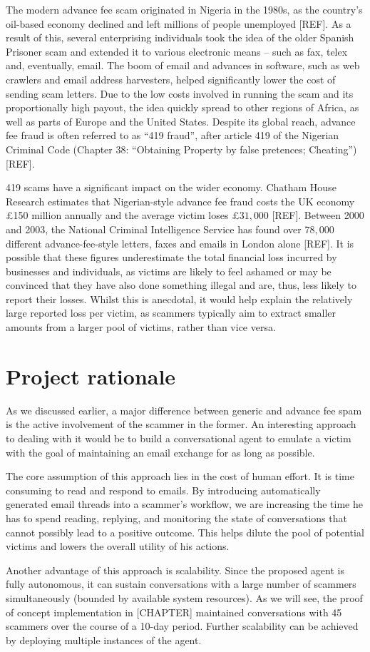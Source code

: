 The modern advance fee scam originated in Nigeria in the 1980s, as the country's oil-based economy declined and left millions of people unemployed [REF]. As a result of this, several enterprising individuals took the idea of the older Spanish Prisoner scam and extended it to various electronic means -- such as fax, telex and, eventually, email. The boom of email and advances in software, such as web crawlers and email address harvesters, helped significantly lower the cost of sending scam letters. Due to the low costs involved in running the scam and its proportionally high payout, the idea quickly spread to other regions of Africa, as well as parts of Europe and the United States. Despite its global reach, advance fee fraud is often referred to as ``419 fraud'', after article 419 of the Nigerian Criminal Code (Chapter 38: “Obtaining Property by false pretences; Cheating”) [REF].

419 scams have a significant impact on the wider economy. Chatham House Research estimates that Nigerian-style advance fee fraud costs the UK economy \pounds150 million annually and the average victim loses \pounds$31,000$ [REF]. Between 2000 and 2003, the National Criminal Intelligence Service has found over $78,000$ different advance-fee-style letters, faxes and emails in London alone [REF]. It is possible that these figures underestimate the total financial loss incurred by businesses and individuals, as victims are likely to feel ashamed or may be convinced that they have also done something illegal and are, thus, less likely to report their losses. Whilst this is anecdotal, it would help explain the relatively large reported loss per victim, as scammers typically aim to extract smaller amounts from a larger pool of victims, rather than vice versa.

\section{Project rationale}
As we discussed earlier, a major difference between generic and advance fee spam is the active involvement of the scammer in the former. An interesting approach to dealing with it would be to build a conversational agent to emulate a victim with the goal of maintaining an email exchange for as long as possible.

The core assumption of this approach lies in the cost of human effort. It is time consuming to read and respond to emails. By introducing automatically generated email threads into a scammer's workflow, we are increasing the time he has to spend reading, replying, and monitoring the state of conversations that cannot possibly lead to a positive outcome. This helps dilute the pool of potential victims and lowers the overall utility of his actions.

Another advantage of this approach is scalability. Since the proposed agent is fully autonomous, it can sustain conversations with a large number of scammers simultaneously (bounded by available system resources). As we will see, the proof of concept implementation in [CHAPTER] maintained conversations with 45 scammers over the course of a 10-day period. Further scalability can be achieved by deploying multiple instances of the agent.